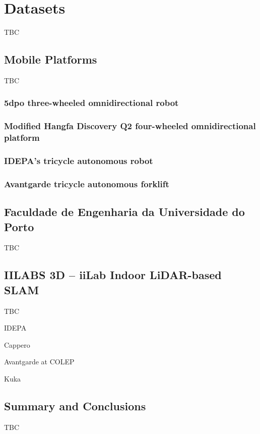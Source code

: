 \chapter{Datasets}\label{chap:datasets}

TBC

\section{Mobile Platforms}\label{sec:datasets:platforms}

TBC

\subsection{5dpo three-wheeled omnidirectional robot}
\subsection{Modified Hangfa Discovery Q2 four-wheeled omnidirectional platform}
\subsection{IDEPA's tricycle autonomous robot}
\subsection{Avantgarde tricycle autonomous forklift}

\section{Faculdade de Engenharia da Universidade do Porto}\label{sec:datasets:feup}

TBC

\section{IILABS 3D -- iiLab Indoor LiDAR-based SLAM}\label{sec:datasets:iilabs3d}

TBC

IDEPA

Cappero

Avantgarde at COLEP

Kuka

\section{Summary and Conclusions}\label{sec:datasets:conclusions}

TBC
